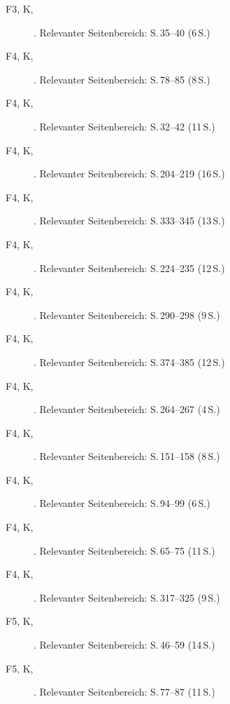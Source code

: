\begin{description}
  \item[F3, K, \cite{tschoppbuholzergruetter2022intergruppenkontakt}] . Relevanter Seitenbereich: S.\,35--40 (6\,S.)
  \item[F4, K, \cite{buholzerkummerwyss2010reaktionen}] . Relevanter Seitenbereich: S.\,78--85 (8\,S.)
  \item[F4, K, \cite{muelleroppliger2021plurale}] . Relevanter Seitenbereich: S.\,32--42 (11\,S.)
  \item[F4, K, \cite{muelleroppliger2021begabungsmodelle}] . Relevanter Seitenbereich: S.\,204--219 (16\,S.)
  \item[F4, K, \cite{reisrenzullimueller2021sem}] . Relevanter Seitenbereich: S.\,333--345 (13\,S.)
  \item[F4, K, \cite{muelleroppliger2021paeddiagnostik}] . Relevanter Seitenbereich: S.\,224--235 (12\,S.)
  \item[F4, K, \cite{weigand2021separativ}] . Relevanter Seitenbereich: S.\,290--298 (9\,S.)
  \item[F4, K, \cite{muelleroppliger2021adaptive}] . Relevanter Seitenbereich: S.\,374--385 (12\,S.)
  \item[F4, K, \cite{schulteterhardt2020potenzialentwicklung}] . Relevanter Seitenbereich: S.\,264--267 (4\,S.)
  \item[F4, K, \cite{lehwald2017motivation}] . Relevanter Seitenbereich: S.\,151--158 (8\,S.)
  \item[F4, K, \cite{hoyer2013begabung}] . Relevanter Seitenbereich: S.\,94--99 (6\,S.)
  \item[F4, K, \cite{sedmak2021bildungsgerechtigkeit}] . Relevanter Seitenbereich: S.\,65--75 (11\,S.)
  \item[F4, K, \cite{grossenbacher2014integrative}] . Relevanter Seitenbereich: S.\,317--325 (9\,S.)
  \item[F5, K, \cite{weigand2021person}] . Relevanter Seitenbereich: S.\,46--59 (14\,S.)
  \item[F5, K, \cite{horvath2021elite}] . Relevanter Seitenbereich: S.\,77--87 (11\,S.)

\end{description}
